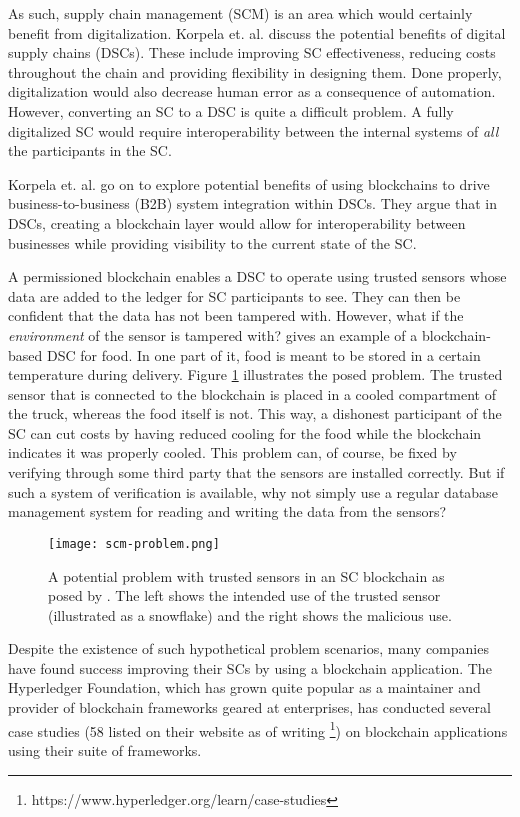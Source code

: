 As such, supply chain management (SCM) is an area which would
certainly benefit from digitalization. Korpela et. al.
\cite{korpelaDSC} discuss the potential benefits of digital supply
chains (DSCs). These include improving SC effectiveness, reducing
costs throughout the chain and providing flexibility in designing
them. Done properly, digitalization would also decrease human error as
a consequence of automation.  However, converting an SC to a DSC is
quite a difficult problem. A fully digitalized SC would require
interoperability between the internal systems of \textit{all} the
participants in the SC.

Korpela et. al. go on to explore potential benefits of using
blockchains to drive business-to-business (B2B) system integration
within DSCs. They argue that in DSCs, creating a blockchain layer
would allow for interoperability between businesses while providing
visibility to the current state of the SC.

A permissioned blockchain enables a DSC to operate using trusted
sensors whose data are added to the ledger for SC participants to see.
They can then be confident that the data has not been tampered with.
However, what if the \textit{environment} of the sensor is tampered
with? \cite{wustBlockchainNeed} gives an example of a blockchain-based
DSC for food. In one part of it, food is meant to be stored in a
certain temperature during delivery. Figure \ref{fig:scm-problem}
illustrates the posed problem. The trusted sensor that is connected to
the blockchain is placed in a cooled compartment of the truck, whereas
the food itself is not. This way, a dishonest participant of the SC
can cut costs by having reduced cooling for the food while the
blockchain indicates it was properly cooled. This problem can, of
course, be fixed by verifying through some third party that the
sensors are installed correctly. But if such a system of verification
is available, why not simply use a regular database management system
for reading and writing the data from the sensors?

\begin{figure}
  \texttt{[image: scm-problem.png]}
  \caption{A potential problem with trusted sensors in an SC
  blockchain as posed by \cite{wustBlockchainNeed}. The left shows the
  intended use of the trusted sensor (illustrated as a snowflake) and
  the right
  shows the malicious use.}
  \label{fig:scm-problem}
\end{figure}

Despite the existence of such hypothetical problem scenarios, many
companies have found success improving their SCs by using a blockchain
application. The Hyperledger Foundation, which has grown quite popular
as a maintainer and provider of blockchain frameworks geared at
enterprises, has conducted several case studies (58 listed on their
website as of writing
\footnote{https://www.hyperledger.org/learn/case-studies}) on
blockchain applications using their suite of frameworks.

